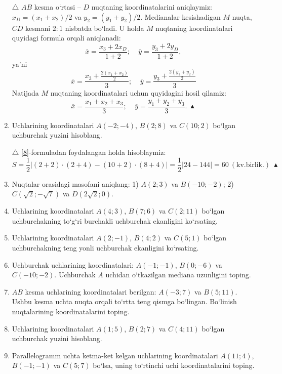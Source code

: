 \begin{enumerate}
	$\triangle$ $AB$ kesma o`rtasi -- $D$ nuqtaning koordinatalarini aniqlaymiz: $x_{D}=(x_{1}+x_{2})/2$ va $y_{2}=(y_{1}+y_{2})/2$. Medianalar kesishadigan $M$ nuqta, $CD$ kesmani $2:1$ nisbatda bo`ladi. U holda $M$ nuqtaning koordinatalari quyidagi formula orqali aniqlanadi:
	$$\overline{x}=\frac{x_{3}+2x_{D}}{1+2};\ \ \ \ \ \overline{y}=\frac{y_{3}+2y_{D}}{1+2},$$
	ya'ni
	$$\overline{x}=\frac{x_{3}+\frac{2(x_{1}+x_{2})}{2}}{3};\ \ \ \ \ \overline{y}=\frac{y_{3}+\frac{2(y_{1}+y_{2})}{2}}{3}$$
	Natijada $M$ nuqtaning koordinatalari uchun quyidagini hosil qilamiz:
	$$\overline{x}=\frac{x_{1}+x_{2}+x_{3}}{3};\ \ \ \ \ \overline{y}=\frac{y_{1}+y_{2}+y_{3}}{3}.\  \blacktriangle$$
	
	\item Uchlarining koordinatalari $A(-2;-4)$, $B(2;8)$ va $C(10;2)$ bo`lgan uchburchak yuzini hisoblang.
	
	$\triangle$ \eqref{8}-formuladan foydalangan holda hisoblaymiz:
	$$S=\frac{1}{2}\left|(2+2)\cdot(2+4)-(10+2)\cdot(8+4)\right|=\frac{1}{2}\left|24-144 \right|=60\ (\textrm{kv.birlik.})\ \blacktriangle$$ 
	
	\item Nuqtalar orasidagi masofani aniqlang: 1) $A(2;3)$ va $B(-10;-2)$; 2) $C(\sqrt{2};-\sqrt{7})$ va $D(2\sqrt{2};0)$.
	
	\item Uchlarining koordinatalari $A(4;3)$, $B(7;6)$ va $C(2;11)$ bo`lgan uchburchakning to`g`ri burchakli uchburchak ekanligini ko`rsating.
	
	\item Uchlarining koordinatalari $A(2;-1)$, $B(4;2)$ va $C(5;1)$ bo`lgan uchburchakning teng yonli uchburchak ekanligini ko`rsating.
	
	\item Uchburchak uchlarining koordinatalari: $A(-1;-1)$, $B(0;-6)$ va $C(-10;-2)$. Uchburchak $A$ uchidan o`tkazilgan mediana uzunligini toping.
	
	\item $AB$ kesma uchlarining koordinatalari berilgan: $A(-3;7)$ va $B(5;11)$. Ushbu kesma uchta nuqta orqali to`rtta teng qismga bo`lingan. Bo`linish nuqtalarining koordinatalarini toping.
	
	\item Uchlarining koordinatalari $A(1;5)$, $B(2;7)$ va $C(4;11)$ bo`lgan uchburchak yuzini hisoblang.
	
	\item Parallelogramm uchta ketma-ket kelgan uchlarining koordinatalari $A(11;4)$, $B(-1;-1)$ va $C(5;7)$ bo`lsa, uning to`rtinchi uchi koordinatalarini toping.
	

\end{enumerate}
